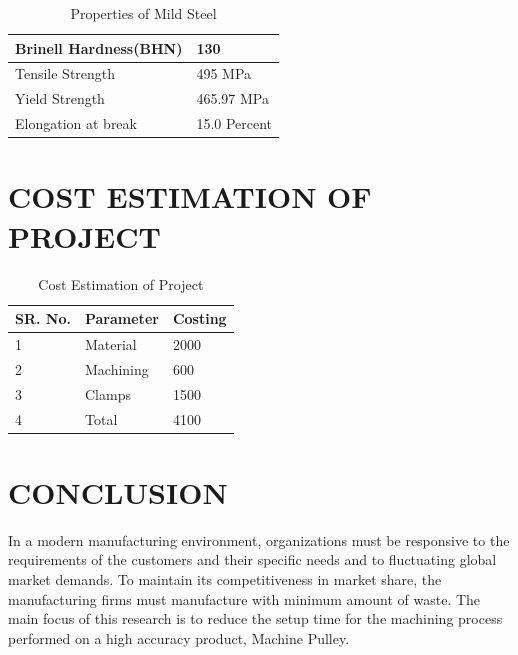 \documentclass[16pt,a4paper]{article}
\begin{document}
\begin{enumerate}
\begin{table}[H]
\end{table}

\begin{table}[H]

\centering
\caption{Properties of Mild Steel}
\begin{tabular}{| l | l |}
\hline
Brinell Hardness(BHN) & 130 \\
\hline
Tensile Strength & 495 MPa \\
\hline
Yield Strength & 465.97 MPa \\
\hline
Elongation at break & 15.0 Percent \\
\hline
\end{tabular}

\end{table}

\end{enumerate}

\pagebreak

\section{COST ESTIMATION OF PROJECT}

\begin{table}[H]

\centering
\caption{Cost Estimation of Project}
\begin{tabular}{| l | l | l |}
\hline
SR. No. &  Parameter & Costing \\
\hline
1 & Material & 2000 \\
\hline
2 & Machining & 600 \\
\hline
3 & Clamps & 1500 \\
\hline
4 & Total & 4100 \\
\hline
\end{tabular}

\end{table}

\pagebreak

\section{CONCLUSION}

In a modern manufacturing environment, organizations must be responsive to the requirements of the customers and their specific needs and to fluctuating global market demands. To maintain its competitiveness in market share, the manufacturing firms must manufacture with  minimum amount of waste. The main focus of this research is to reduce the setup time for the machining process performed on a high accuracy product, Machine Pulley.
\end{document}
